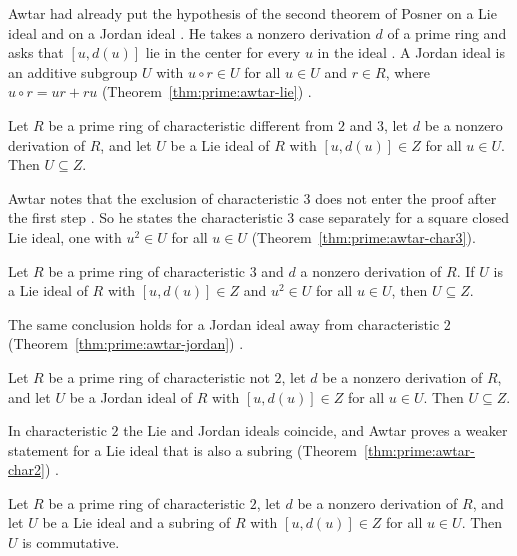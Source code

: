 Awtar had already put the hypothesis of the second theorem of Posner on a Lie ideal
and on a Jordan ideal \cite[p.~67]{Awtar1973}. He takes a nonzero derivation $d$ of
a prime ring and asks that $[u,d(u)]$ lie in the center for every $u$ in the ideal
\cite[p.~68]{Awtar1973}. A Jordan ideal is an additive subgroup $U$ with
$u\circ r\in U$ for all $u\in U$ and $r\in R$, where $u\circ r=ur+ru$ (Theorem~\ref{thm:prime:awtar-lie})
\cite[p.~71]{Awtar1973}.\begin{theorem}\label{thm:prime:awtar-lie}
Let $R$ be a prime ring of characteristic different from $2$ and $3$, let $d$ be
a nonzero derivation of $R$, and let $U$ be a Lie ideal of $R$ with $[u,d(u)]\in Z$
for all $u\in U$. Then $U\subseteq Z$.
\end{theorem}

Awtar notes that the exclusion of characteristic $3$ does not enter the proof
after the first step \cite[p.~71]{Awtar1973}. So he states the characteristic
$3$ case separately for a square closed Lie ideal, one with $u^{2}\in U$ for
all $u\in U$ (Theorem~\ref{thm:prime:awtar-char3}).

\begin{theorem}\label{thm:prime:awtar-char3}
Let $R$ be a prime ring of characteristic $3$ and $d$ a nonzero derivation of $R$.
If $U$ is a Lie ideal of $R$ with $[u,d(u)]\in Z$ and $u^{2}\in U$ for all $u\in U$,
then $U\subseteq Z$.
\end{theorem}

The same conclusion holds for a Jordan ideal away from characteristic $2$ (Theorem~\ref{thm:prime:awtar-jordan})
\cite[p.~71]{Awtar1973}.\begin{theorem}\label{thm:prime:awtar-jordan}
Let $R$ be a prime ring of characteristic not $2$, let $d$ be a nonzero derivation
of $R$, and let $U$ be a Jordan ideal of $R$ with $[u,d(u)]\in Z$ for all $u\in U$.
Then $U\subseteq Z$.
\end{theorem}

In characteristic $2$ the Lie and Jordan ideals coincide, and Awtar proves a
weaker statement for a Lie ideal that is also a subring
(Theorem~\ref{thm:prime:awtar-char2}) \cite[p.~72]{Awtar1973}.

\begin{theorem}\label{thm:prime:awtar-char2}
Let $R$ be a prime ring of characteristic $2$, let $d$ be a nonzero derivation of
$R$, and let $U$ be a Lie ideal and a subring of $R$ with $[u,d(u)]\in Z$ for all
$u\in U$. Then $U$ is commutative.
\end{theorem}


